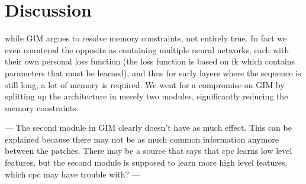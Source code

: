 \documentclass[]{book}
\begin{document}
\newcommand{\R}[0]{\mathbb{R}}

\newcommand{\qzzblank}[0]{q(\cdot \mid \zt^{m-1})}

\newcommand{\latentspaceconstraintgim}[0]{\kl{ \qzzblank }{ \standardnormal } }

\newcommand{\sampleqdot}[1]{q(\cdot \mid #1)}


\newcommand{\reconstrgim}[0]{\sum_k
	\expected{
		\sample{\ztk^m}{\sampleqdot{\ztk^{m-1}} } \\ 
		\sample{\zt^m}{q(\sampleqdot{\zt^{m-1}}} } 
	\left[ \gim \right]
}


\newcommand{\genc}[0]{g_{enc}(\cdot)}
\newcommand{\gencm}[0]{g_{enc}^m(\cdot)}
\newcommand{\gencM}[0]{g_{enc}^M(\cdot)}

\newcommand{\gar}[0]{g_{ar}(\cdot)}

\newcommand{\Lvnce}[0]{\mathcal{L}_{\text{V-NCE}}}
\newcommand{\Lnce}[0]{\mathcal{L}_{\text{NCE}}}

\newcommand{\qfromzmneg}[0]{\sampleqdot{\zt^{m-1}}}
\newcommand{\qfromzm}[0]{\sampleqdot{\zt^m}}
\newcommand{\qfromzM}[0]{\sampleqdot{\zt^M}}

\newcommand{\normalfatmusigma}[0]{\mathcal{N}(\mufat, \text{diag}(\sigmafat^2))}










\chapter{Discussion}
while GIM argues to resolve memory constraints, not entirely true. In fact we even countered the opposite as containing multiple neural networks, each with their own personal loss function (the loss function is based on fk which contains parameters that must be learned), and thus for early layers where the sequence is still long, a lot of memory is required. We went for a compromise on GIM by splitting up the architecture in merely two modules, significantly reducing the memory constraints.


---
The second module in GIM clearly doesn't have as much effect. This can be explained because there may not be as much common information anymore between the patches. There may be a source that says that cpc learns low level features, but the second module is supposed to learn more high level features, which cpc may have trouble with?
---
\end{document}
